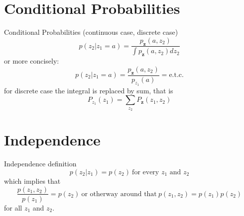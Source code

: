 \documentclass{beamer}
\begin{document}
\section{Conditional Probabilities}

\begin{frame}{Conditional Probabilities}
  (continuous case, discrete case)
  \[
  p(z_2|z_1 = a) =
  \frac{ p_{\mathbf{z}}(a, z_2)}{\int p_{\mathbf{z}}(a, z_2)dz_2}
  \]
  or more concisely:
  \[
  p(z_2|z_1 = a) =
  \frac{ p_{\mathbf{z}}(a, z_2)}{p_{z_1}(a)} = \text{e.t.c.}
  \]
  for discrete case the integral is replaced by sum, that is
  \[ P_{z_1}(z_1) = \sum_{z_2}P_{\mathbf{z}}(z_1, z_2)\]
\end{frame}

\section{Independence}

\begin{frame}{Independence}
  definition
  \[
  p(z_2|z_1) = p(z_2) \ \text{for every $z_1$ and $z_2$}
  \]
  which implies that
  \[
  \frac{p(z_1, z_2)}{p(z_1)} = p(z_2) \ \text{or otherway around that} \ p(z_1, z_2) = p(z_1)p(z_2)
  \]
  for all $z_1$ and $z_2$.
\end{frame}

%
%
%
\end{document}
